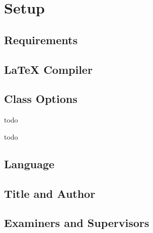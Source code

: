 \chapter{Setup}

\section{Requirements} 

\section{LaTeX Compiler} 

\section{Class Options} 

\begin{description}[font=\ttfamily,leftmargin=!,labelwidth=\widthof{\ttfamily nologo, logo}]
	\item[ba, ma] todo
	\item[nologo, logo] todo 
\end{description}

\section{Language} 

\section{Title and Author}

\section{Examiners and Supervisors} 